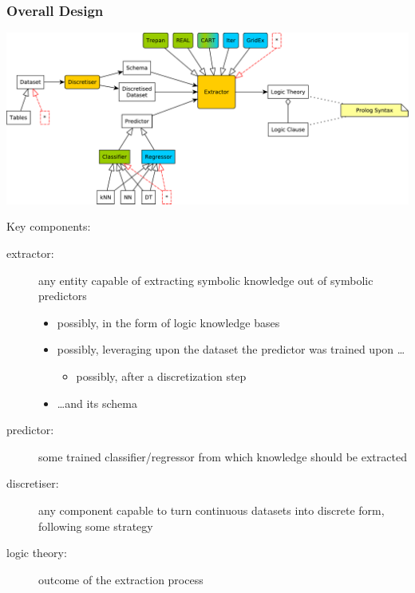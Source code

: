 \documentclass[presentation]{beamer}\mode<presentation>{\usetheme{AMSBolognaFC}}
\begin{document}
\begin{frame}[allowframebreaks]
\frametitle{Overall Design}

    \begin{center}
        \includegraphics[width=\linewidth]{figures/Psyke.pdf}
    \end{center}

    \framebreak

    Key components:
    \begin{description}
        \item[extractor:] any entity capable of extracting symbolic knowledge out of symbolic predictors
        \begin{itemize}
            \item possibly, in the form of logic \alert{knowledge bases}
            \item possibly, leveraging upon the \alert{dataset} the predictor was trained upon \ldots
            \begin{itemize}
                \item possibly, after a \alert{discretization} step
            \end{itemize}
            \item \ldots and its \alert{schema}
        \end{itemize}

        \item[predictor:] some trained classifier/regressor from which knowledge should be extracted
        
        \item[discretiser:] any component capable to turn continuous datasets into discrete form, following some strategy
        
        \item[logic theory:] outcome of the extraction process
    \end{description}


\end{frame}
\end{document}
